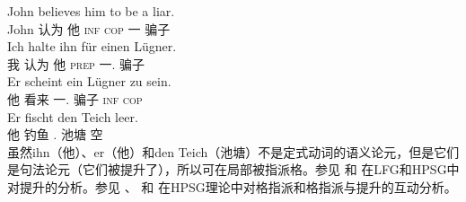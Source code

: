 \addlines
\eal
\ex 
\gll John believes him to be a liar.\\
	 John 认为 他 \textsc{inf} \textsc{cop} 一 骗子\\
\ex 
\gll Ich halte ihn für einen Lügner.\\
	我 认为 他 \textsc{prep} 一.\acc{} 骗子\\
\ex 
\gll Er scheint ein Lügner zu sein.\\
	 他 看来 一.\nom{} 骗子 \textsc{inf} \textsc{cop}\\
\ex 
\gll Er fischt den Teich leer.\\
	 他 钓鱼 .\acc{} 池塘 空\\
\zl
虽然ihn（他）、er（他）和den Teich（池塘）不是定式动词的语义论元，但是它们是句法论元（它们被提升了），所以可在局部被指派格。参见 和 在LFG\indexlfg 和HPSG\indexhpsg 中对提升的分析。参见 、 和 在HPSG理论中对格指派和格指派与提升的互动分析。

